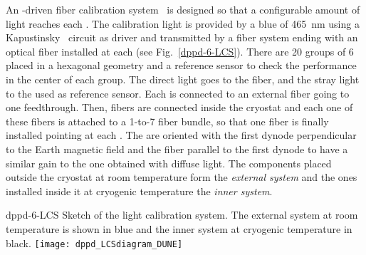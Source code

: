 An -driven fiber calibration system~\cite{Cuesta:2017nrs,Conrad:2015xta,Caccianiga:2003fm,ADAMSON2002325,Belver:2019lqm} is designed so that a configurable amount of light reaches each . The calibration light is provided by a blue  of \SI{465}{\nm} using a Kapustinsky~\cite{KAPUSTINSKY1985612} circuit as  driver and transmitted by a fiber system ending with an optical fiber installed at each  (see Fig.~\ref{dppd-6-LCS}). There are 20 groups of 6  placed in a hexagonal geometry and a reference sensor to check the  performance in the center of each group. The direct light goes to the fiber, and the stray light to the  used as reference sensor. Each  is connected to an external fiber going to one feedthrough. Then, fibers are connected inside the cryostat and each one of these fibers is attached to a 1-to-7 fiber bundle, so that one fiber is finally installed pointing at each . The  are oriented with the first dynode perpendicular to the Earth magnetic field and the fiber parallel to the first dynode to have a similar gain to the one obtained with diffuse light. The components placed outside the cryostat at room temperature form the \textit{external system} and the ones installed inside it at cryogenic temperature the \textit{inner system}. 


\begin{dunefigure}{dppd-6-LCS}
{Sketch of the    light calibration system. The external system at room temperature is shown in blue and the inner system at cryogenic temperature in black.}
\texttt{[image: dppd\_LCSdiagram\_DUNE]}
\end{dunefigure}


